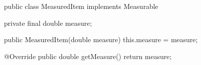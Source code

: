 \begin{unipdcode}[language=Java]
public class MeasuredItem implements Measurable {
    private final double measure;

    public MeasuredItem(double measure) {
        this.measure = measure;
    }

    @Override
    public double getMeasure() {
        return measure;
    }
}
\end{unipdcode}
